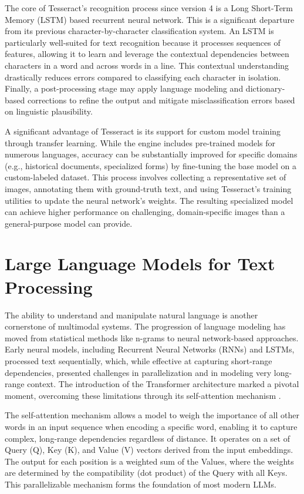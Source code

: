 The core of Tesseract's recognition process since version 4 is a Long Short-Term Memory (LSTM) based recurrent neural network. This is a significant departure from its previous character-by-character classification system. An LSTM is particularly well-suited for text recognition because it processes sequences of features, allowing it to learn and leverage the contextual dependencies between characters in a word and across words in a line. This contextual understanding drastically reduces errors compared to classifying each character in isolation. Finally, a post-processing stage may apply language modeling and dictionary-based corrections to refine the output and mitigate misclassification errors based on linguistic plausibility.

A significant advantage of Tesseract is its support for custom model training through transfer learning. While the engine includes pre-trained models for numerous languages, accuracy can be substantially improved for specific domains (e.g., historical documents, specialized forms) by fine-tuning the base model on a custom-labeled dataset. This process involves collecting a representative set of images, annotating them with ground-truth text, and using Tesseract's training utilities to update the neural network's weights. The resulting specialized model can achieve higher performance on challenging, domain-specific images than a general-purpose model can provide.

\section{Large Language Models for Text Processing}
\label{sec:background_llm}
The ability to understand and manipulate natural language is another cornerstone of multimodal systems. The progression of language modeling has moved from statistical methods like n-grams to neural network-based approaches. Early neural models, including Recurrent Neural Networks (RNNs) and LSTMs, processed text sequentially, which, while effective at capturing short-range dependencies, presented challenges in parallelization and in modeling very long-range context. The introduction of the Transformer architecture marked a pivotal moment, overcoming these limitations through its self-attention mechanism \cite{vaswani2017attention}.

The self-attention mechanism allows a model to weigh the importance of all other words in an input sequence when encoding a specific word, enabling it to capture complex, long-range dependencies regardless of distance. It operates on a set of Query (Q), Key (K), and Value (V) vectors derived from the input embeddings. The output for each position is a weighted sum of the Values, where the weights are determined by the compatibility (dot product) of the Query with all Keys. This parallelizable mechanism forms the foundation of most modern LLMs.

